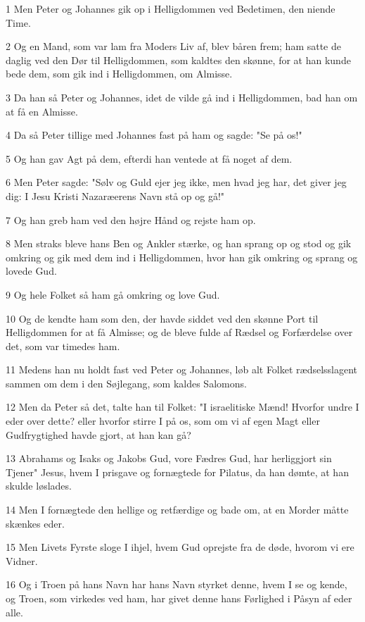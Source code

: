 \par 1 Men Peter og Johannes gik op i Helligdommen ved Bedetimen, den niende Time.
\par 2 Og en Mand, som var lam fra Moders Liv af, blev båren frem; ham satte de daglig ved den Dør til Helligdommen, som kaldtes den skønne, for at han kunde bede dem, som gik ind i Helligdommen, om Almisse.
\par 3 Da han så Peter og Johannes, idet de vilde gå ind i Helligdommen, bad han om at få en Almisse.
\par 4 Da så Peter tillige med Johannes fast på ham og sagde: "Se på os!"
\par 5 Og han gav Agt på dem, efterdi han ventede at få noget af dem.
\par 6 Men Peter sagde: "Sølv og Guld ejer jeg ikke, men hvad jeg har, det giver jeg dig: I Jesu Kristi Nazaræerens Navn stå op og gå!"
\par 7 Og han greb ham ved den højre Hånd og rejste ham op.
\par 8 Men straks bleve hans Ben og Ankler stærke, og han sprang op og stod og gik omkring og gik med dem ind i Helligdommen, hvor han gik omkring og sprang og lovede Gud.
\par 9 Og hele Folket så ham gå omkring og love Gud.
\par 10 Og de kendte ham som den, der havde siddet ved den skønne Port til Helligdommen for at få Almisse; og de bleve fulde af Rædsel og Forfærdelse over det, som var timedes ham.
\par 11 Medens han nu holdt fast ved Peter og Johannes, løb alt Folket rædselsslagent sammen om dem i den Søjlegang, som kaldes Salomons.
\par 12 Men da Peter så det, talte han til Folket: "I israelitiske Mænd! Hvorfor undre I eder over dette? eller hvorfor stirre I på os, som om vi af egen Magt eller Gudfrygtighed havde gjort, at han kan gå?
\par 13 Abrahams og Isaks og Jakobs Gud, vore Fædres Gud, har herliggjort sin Tjener" Jesus, hvem I prisgave og fornægtede for Pilatus, da han dømte, at han skulde løslades.
\par 14 Men I fornægtede den hellige og retfærdige og bade om, at en Morder måtte skænkes eder.
\par 15 Men Livets Fyrste sloge I ihjel, hvem Gud oprejste fra de døde, hvorom vi ere Vidner.
\par 16 Og i Troen på hans Navn har hans Navn styrket denne, hvem I se og kende, og Troen, som virkedes ved ham, har givet denne hans Førlighed i Påsyn af eder alle.
